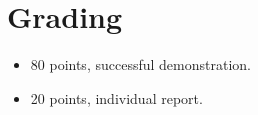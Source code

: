 \section{Grading}
\begin{itemize}
\item 80 points, successful demonstration.
\item 20 points, individual report.  
\end{itemize}



